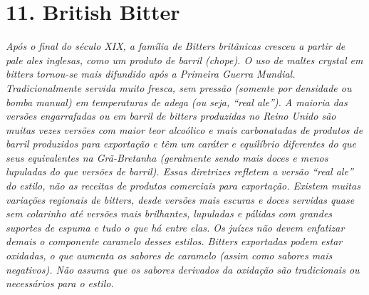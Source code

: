 \section*{11. British Bitter}
\textit{Após o final do século XIX, a família de Bitters britânicas cresceu a partir de pale ales inglesas, como um produto de barril (chope). O uso de maltes crystal em bitters tornou-se mais difundido após a Primeira Guerra Mundial. Tradicionalmente servida muito fresca, sem pressão (somente por densidade ou bomba manual) em temperaturas de adega (ou seja, “real ale”). A maioria das versões engarrafadas ou em barril de bitters produzidas no Reino Unido são muitas vezes versões com maior teor alcoólico e mais carbonatadas de produtos de barril produzidos para exportação e têm um caráter e equilíbrio diferentes do que seus equivalentes na Grã-Bretanha (geralmente sendo mais doces e menos lupuladas do que versões de barril). Essas diretrizes refletem a versão “real ale” do estilo, não as receitas de produtos comerciais para exportação. Existem muitas variações regionais de bitters, desde versões mais escuras e doces servidas quase sem colarinho até versões mais brilhantes, lupuladas e pálidas com grandes suportes de espuma e tudo o que há entre elas. Os juízes não devem enfatizar demais o componente caramelo desses estilos. Bitters exportadas podem estar oxidadas, o que aumenta os sabores de caramelo (assim como sabores mais negativos). Não assuma que os sabores derivados da oxidação são tradicionais ou necessários para o estilo.}